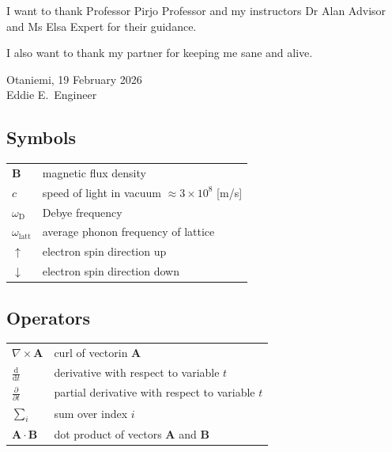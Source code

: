 \documentclass[english, 12pt, a4paper, elec, utf8, a-2b, online]{aaltothesis}
\begin{document}
\dothesispagenumbering{}

I want to thank Professor Pirjo Professor and my instructors Dr Alan Advisor and
Ms Elsa Expert for their guidance.

I also want to thank my partner for keeping me sane and alive.

\vspace{5cm}
Otaniemi, 19 February 2026\\

\vspace{5mm}
{\hfill Eddie E.\ Engineer \hspace{1cm}}

\newpage


\thesistableofcontents



\subsection*{Symbols}

\begin{tabular}{ll}
$\mathbf{B}$  & magnetic flux density  \\
$c$              & speed of light in vacuum $\approx 3\times10^8$ [m/s]\\
$\omega_{\mathrm{D}}$    & Debye frequency \\
$\omega_{\mathrm{latt}}$ & average phonon frequency of lattice \\
$\uparrow$       & electron spin direction up\\
$\downarrow$     & electron spin direction down
\end{tabular}

\subsection*{Operators}

\begin{tabular}{ll}
$\nabla \times \mathbf{A}$              & curl of vectorin $\mathbf{A}$\\
$\displaystyle\frac{\mbox{d}}{\mbox{d} t}$ & derivative with respect to 
variable $t$\\[3mm]
$\displaystyle\frac{\partial}{\partial t}$  & partial derivative with respect 
to variable $t$ \\[3mm]
$\sum_i $                       & sum over index $i$\\
$\mathbf{A} \cdot \mathbf{B}$    & dot product of vectors $\mathbf{A}$ and 
$\mathbf{B}$
\end{tabular}
\end{document}
